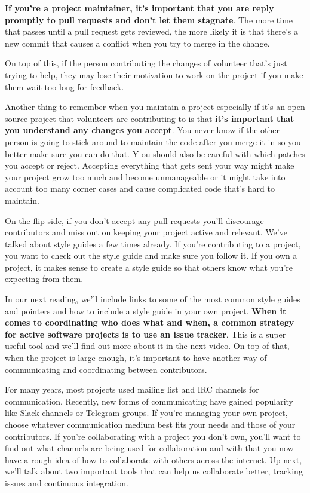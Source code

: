 	\textbf{If you're a project maintainer, it's important that you are reply promptly to pull requests and don't let them stagnate}. The more time that passes until a pull request gets reviewed, the more likely it is that there's a new commit that causes a conflict when you try to merge in the change. 
	
	On top of this, if the person contributing the changes of volunteer that's just trying to help, they may lose their motivation to work on the project if you make them wait too long for feedback.
	
	Another thing to remember when you maintain a project especially if it's an open source project that volunteers are contributing to is that \textbf{it's important that you understand any changes you accept}. You never know if the other person is going to stick around to maintain the code after you merge it in so you better make sure you can do that.
	Y ou should also be careful with which patches you accept or reject. Accepting everything that gets sent your way might make your project grow too much and become unmanageable or it might take into account too many corner cases and cause complicated code that's hard to maintain. 
	
	On the flip side, if you don't accept any pull requests you'll discourage contributors and miss out on keeping your project active and relevant. We've talked about style guides a few times already. If you're contributing to a project, you want to check out the style guide and make sure you follow it. If you own a project, it makes sense to create a style guide so that others know what you're expecting from them. 
	
	In our next reading, we'll include links to some of the most common style guides and pointers and how to include a style guide in your own project. \textbf{When it comes to coordinating who does what and when, a common strategy for active software projects is to use an issue tracker}. This is a super useful tool and we'll find out more about it in the next video. On top of that, when the project is large enough, it's important to have another way of communicating and coordinating between contributors. 
	
	For many years, most projects used mailing list and IRC channels for communication. 	
	Recently, new forms of communicating have gained popularity like Slack channels or Telegram groups. 
	If you're managing your own project, choose whatever communication medium best fits your needs and those of your contributors. If you're collaborating with a project you don't own, you'll want to find out what channels are being used for collaboration and with that you now have a rough idea of how to collaborate with others across the internet. Up next, we'll talk about two important tools that can help us collaborate better, tracking issues and continuous integration.
	
